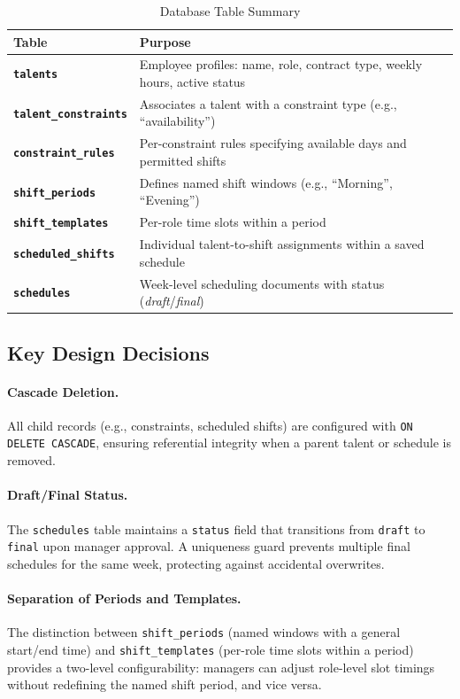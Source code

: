 \begin{table}[H]
\centering
\caption{Database Table Summary}
\label{tab:db_tables}
\begin{tabular}{>{\bfseries}p{4cm} p{9cm}}
\toprule
Table & Purpose \\
\midrule
\texttt{talents} & Employee profiles: name, role, contract type, weekly hours, active status \\
\texttt{talent\_constraints} & Associates a talent with a constraint type (e.g., ``availability'') \\
\texttt{constraint\_rules} & Per-constraint rules specifying available days and permitted shifts \\
\texttt{shift\_periods} & Defines named shift windows (e.g., ``Morning'', ``Evening'') \\
\texttt{shift\_templates} & Per-role time slots within a period \\
\texttt{scheduled\_shifts} & Individual talent-to-shift assignments within a saved schedule \\
\texttt{schedules} & Week-level scheduling documents with status (\textit{draft}/\textit{final}) \\
\bottomrule
\end{tabular}
\end{table}

\subsection{Key Design Decisions}

\paragraph{Cascade Deletion.} All child records (e.g., constraints, scheduled shifts) are configured with \texttt{ON DELETE CASCADE}, ensuring referential integrity when a parent talent or schedule is removed.

\paragraph{Draft/Final Status.} The \texttt{schedules} table maintains a \texttt{status} field that transitions from \texttt{draft} to \texttt{final} upon manager approval. A uniqueness guard prevents multiple final schedules for the same week, protecting against accidental overwrites.

\paragraph{Separation of Periods and Templates.} The distinction between \texttt{shift\_periods} (named windows with a general start/end time) and \texttt{shift\_templates} (per-role time slots within a period) provides a two-level configurability: managers can adjust role-level slot timings without redefining the named shift period, and vice versa.

